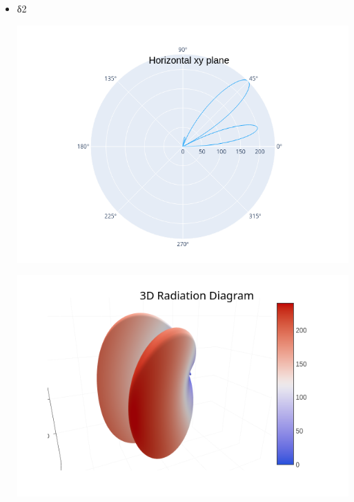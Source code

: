 \documentclass[12pt]{article}
\begin{document}
\begin{itemize}
    \item δ2
    \begin{center}
        \includegraphics*[scale=0.6]{d2_xy.png}
    \end{center}
    \begin{center}
        \includegraphics*[scale=0.6]{d2_3d.png}
    \end{center}


\end{itemize}
\end{document}
